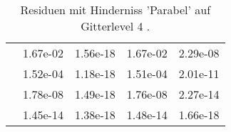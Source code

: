 \begin{table}
\begin{tabular}{c|cc|cc|}
\multicolumn{1}{|c|}{} & \multicolumn{1}{|c|}{  1.67e-02} & \multicolumn{1}{|c|}{  1.56e-18} & \multicolumn{1}{|c|}{  1.67e-02} & \multicolumn{1}{|c|}{  2.29e-08} \\ 
\multicolumn{1}{|c|}{} & \multicolumn{1}{|c|}{  1.52e-04} & \multicolumn{1}{|c|}{  1.18e-18} & \multicolumn{1}{|c|}{  1.51e-04} & \multicolumn{1}{|c|}{  2.01e-11} \\ 
\multicolumn{1}{|c|}{} & \multicolumn{1}{|c|}{  1.78e-08} & \multicolumn{1}{|c|}{  1.49e-18} & \multicolumn{1}{|c|}{  1.76e-08} & \multicolumn{1}{|c|}{  2.27e-14} \\ 
\multicolumn{1}{|c|}{} & \multicolumn{1}{|c|}{  1.45e-14} & \multicolumn{1}{|c|}{  1.38e-18} & \multicolumn{1}{|c|}{  1.48e-14} & \multicolumn{1}{|c|}{  1.66e-18} \\ 
\hline 
\end{tabular}\caption{Residuen mit Hinderniss 'Parabel' auf Gitterlevel 4 .}\label{tab:Residuum_Parabel_level4}
\end{table} 
